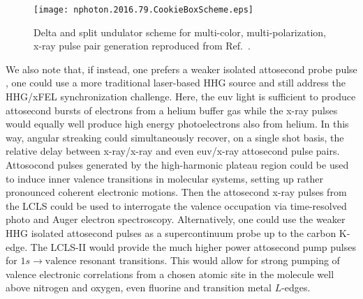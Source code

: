 \begin{figure}[b]
\centerline{\texttt{[image: nphoton.2016.79.CookieBoxScheme.eps]}}
\caption{\label{fig::2color2polScheme} Delta and split undulator scheme for multi-color, multi-polarization, x-ray pulse pair generation reproduced from Ref.~\cite{Lutman2016}. }
\end{figure}

We also note that, if instead, one prefers a weaker isolated attosecond probe pulse \cite{Chen2014,Schmidt2016,Biegert2016,WornerSci2017}, one could use a more traditional laser-based HHG source and still address the HHG/xFEL synchronization challenge.
Here, the euv light is sufficient to produce attosecond bursts of electrons from a helium buffer gas while the x-ray pulses would equally well produce high energy photoelectrons also from helium.
In this way, angular streaking could simultaneously recover, on a single shot basis, the relative delay between x-ray/x-ray and even euv/x-ray attosecond pulse pairs.
Attosocond pulses generated by the high-harmonic plateau region \cite{attoclock2008,Kulander2011} could be used to induce inner valence transitions in molecular systems, setting up rather pronounced coherent electronic motions.
Then the attosecond x-ray pulses from the LCLS could be used to interrogate the valence occupation via time-resolved photo and Auger electron spectroscopy.
Alternatively, one could use the weaker HHG isolated attosecond pulses \cite{Biegert2016} as a supercontinuum probe up to the carbon K-edge.
The LCLS-II would provide the much higher power attosecond pump pulses for $1s\rightarrow\mbox{valence}$ resonant transitions.
This would allow for strong pumping of valence electronic correlations from a chosen atomic site in the molecule well above nitrogen and oxygen, even fluorine and transition metal $L$-edges.

